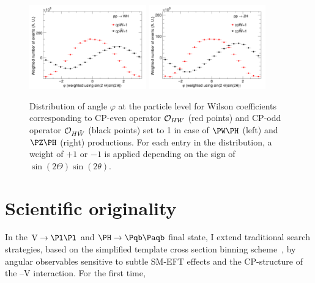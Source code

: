 \documentclass[a4paper,11pt]{article}
\newcommand{\Pb}{{{\Pqb}}\xspace}
\newcommand{\PAb}{{{{\Paqb}}}\xspace}
\renewcommand{\PV}{{{{V}}}\xspace}
\begin{document}
\begin{figure}[tph]
\begin{center}
\includegraphics[width=0.45\textwidth]{Figures/New/LHE/LHE_Plot_phi_WH.png}
\includegraphics[width=0.45\textwidth]{Figures/New/LHE/LHE_Plot_phi_ZH.png}
\end{center}
\caption{
Distribution of angle $\varphi$ at the particle level for Wilson coefficients corresponding to CP-even operator ${\cal O}_{HW}$  (red points) and CP-odd operator ${\cal O}_{H\tilde{W}}$ (black points) set to 1 in case of $\PW\PH$ (left) and $\PZ\PH$ (right) productions.
For each entry in the distribution, a weight of $+1$ or $-1$ is applied depending on the sign of $\sin\left(2\Theta\right) \sin\left(2\theta\right)$. 
}
\label{fig:LHE_phi}
\end{figure}



\section{Scientific originality}

In the $\textrm{\PV}\rightarrow\Pl\Pl$ and $\PH\rightarrow\Pb\PAb$ final state, I extend traditional search strategies, based on the simplified template cross section binning scheme~\cite{Berger:2019wnu}, by angular observables sensitive to subtle SM-EFT effects and the CP-structure of the \PH--\PV interaction. For the first time,
\end{document}

